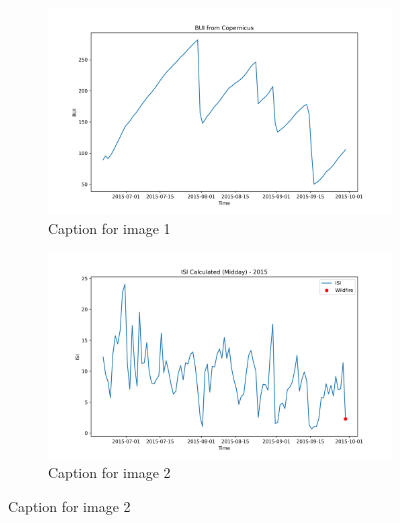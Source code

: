 \begin{figure}[h]
	\caption{HELLo}
	\centering
	\begin{subfigure}{0.49\textwidth}
		\centering
		\includegraphics[width=\textwidth]{graphs/2015/2015CopernicusISI12.png}
		\caption{Caption for image 1}
		\label{fig:img1}
	\end{subfigure}
	\hfill
	\begin{subfigure}{0.49\textwidth}
		\centering
		\includegraphics[width=\textwidth]{graphs/2015/2015CalcISI12.png}
		\caption{Caption for image 2}
		\label{fig:img2}
	\end{subfigure}
	\label{fig:both_images}
\end{figure}

